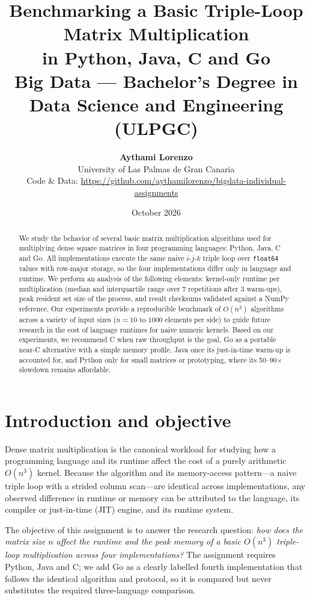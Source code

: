 \documentclass[11pt,a4paper]{article}
\title{\textbf{Benchmarking a Basic Triple-Loop Matrix Multiplication\\
in Python, Java, C and Go}\\
\vspace{0.5cm}
\Large Big Data --- Bachelor's Degree in Data Science and Engineering (ULPGC)}
\author{\textbf{Aythami Lorenzo} \\[0.1cm]
\small University of Las Palmas de Gran Canaria \\
\small Code \& Data: \url{https://github.com/aythamilorenzo/bigdata-individual-assignments}}
\date{October 2026}
\begin{document}
\maketitle

\begin{abstract}
We study the behavior of several basic matrix multiplication algorithms used for
multiplying dense square matrices in four programming languages: Python, Java, C
and Go. All implementations execute the same naive \(i\text{-}j\text{-}k\) triple
loop over \texttt{float64} values with row-major storage, so the four
implementations differ only in language and runtime. We perform an analysis of
the following elements: kernel-only runtime per multiplication (median and
interquartile range over 7 repetitions after 3 warm-ups), peak resident set
size of the process, and result checksums validated against a NumPy
reference. Our experiments provide a reproducible benchmark of \(O(n^3)\)
algorithms across a variety of input sizes (\(n = 10\) to \(1000\) elements per
side) to guide future research in the cost of language runtimes for naive
numeric kernels. Based on our experiments, we recommend C when raw throughput is
the goal, Go as a portable near-C alternative with a simple memory profile,
Java once its just-in-time warm-up is accounted for, and Python only for small
matrices or prototyping, where its 50--90$\times$ slowdown remains affordable.
\end{abstract}

\tableofcontents
\newpage

\section{Introduction and objective}

Dense matrix multiplication is the canonical workload for studying how a
programming language and its runtime affect the cost of a purely arithmetic
\(O(n^3)\) kernel. Because the algorithm and its memory-access pattern---a
naive triple loop with a strided column scan---are identical across
implementations, any observed difference in runtime or memory can be attributed
to the language, its compiler or just-in-time (JIT) engine, and its runtime
system.

The objective of this assignment is to answer the research question:
\emph{how does the matrix size \(n\) affect the runtime and the peak memory of
a basic \(O(n^3)\) triple-loop multiplication across four implementations?} The
assignment requires Python, Java and C; we add Go as a clearly labelled fourth
implementation that follows the identical algorithm and protocol, so it is
compared but never substitutes the required three-language comparison.
\end{document}
